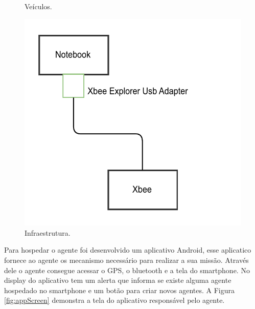 \begin{figure}[htbp]
\begin{minipage}{.5\textwidth}
		\caption{Veículos.}
		\label{fig:arquiteturaPrototipoVeiculo}
	\end{minipage}%
	\begin{minipage}{.5\textwidth}
		\centering
		\includegraphics[scale=0.5]{metodologia/figuras/arquiteturaPrototipoInfraestrtura.pdf}
		\caption{Infraestrutura.}
		\label{fig:arquiteturaPrototipoInfraestrtura}
	\end{minipage}
\end{figure}

Para hospedar o agente foi desenvolvido um aplicativo Android, esse aplicatico fornece ao agente os mecanismo necessário para realizar a sua missão. Através dele o agente consegue acessar o GPS, o bluetooth e a tela do smartphone. No display do aplicativo tem um alerta que informa se existe alguma agente hospedado no smartphone e um botão para criar novos agentes. A Figura \ref{fig:appScreen} demonstra a tela do aplicativo responsável pelo agente.

